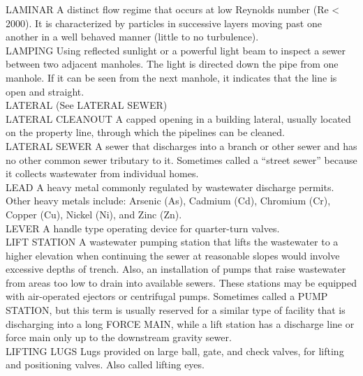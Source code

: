 LAMINAR
A distinct flow regime that occurs at low Reynolds number (Re < 2000). It is characterized by particles in successive layers moving past one another in a well behaved manner (little to no turbulence).
\vspace{0.3cm}\\
LAMPING
Using reflected sunlight or a powerful light beam to inspect a sewer between two adjacent manholes. The light is directed down the pipe from one manhole. If it can be seen from the next manhole, it indicates that the line is open and straight. 
\vspace{0.3cm}\\
LATERAL
(See LATERAL SEWER) 
\vspace{0.3cm}\\
LATERAL CLEANOUT
A capped opening in a building lateral, usually located on the property line, through which the pipelines can be cleaned. 
\vspace{0.3cm}\\
LATERAL SEWER
A sewer that discharges into a branch or other sewer and has no other common sewer tributary to it. Sometimes called a “street sewer” because it collects wastewater from individual homes. 
\vspace{0.3cm}\\
LEAD
A heavy metal commonly regulated by wastewater discharge permits. Other heavy metals include: Arsenic (As), Cadmium (Cd), Chromium (Cr), Copper (Cu), Nickel (Ni), and Zinc (Zn).
\vspace{0.3cm}\\
LEVER
A handle type operating device for quarter-turn valves.
\vspace{0.3cm}\\
LIFT STATION
A wastewater pumping station that lifts the wastewater to a higher elevation when continuing the sewer at reasonable slopes would involve excessive depths of trench. Also, an installation of pumps that raise wastewater from areas too low to drain into available sewers. These stations may be equipped with air-operated ejectors or centrifugal pumps. Sometimes called a PUMP STATION, but this term is usually reserved for a similar type of facility that is discharging into a long FORCE MAIN, while a lift station has a discharge line or force main only up to the downstream gravity sewer. 
\vspace{0.3cm}\\
LIFTING LUGS
Lugs provided on large ball, gate, and check valves, for lifting and positioning valves. Also called lifting eyes.
\vspace{0.3cm}\\

